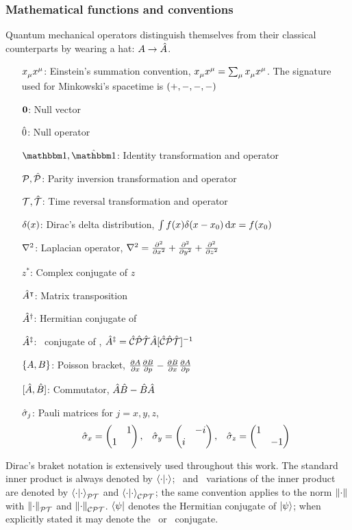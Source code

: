\subsubsection{Mathematical functions and conventions}
Quantum mechanical operators distinguish themselves from their classical counterparts by wearing a hat: $A \to \hat{A}$.
\begin{enumerate}
    \item[$\tensor{x}{_\mu}\tensor{x}{^\mu}$:] Einstein's summation convention, $\tensor{x}{_\mu}\tensor{x}{^\mu} = \sum\nolimits_\mu \tensor{x}{_\mu}\tensor{x}{^\mu}$. The signature used for Minkowski's spacetime is $\pqty{+,-, -, -}$
    \item[$\vb{0}$:] Null vector
    \item[$\hat{0}$:] Null operator 
    \item[$\idM,\hidM$:] Identity transformation and operator
    \item[$\mathcal{P},\mathcal{\hat{P}}$:] Parity inversion transformation and operator  
    \item[$\mathcal{T},\mathcal{\hat{T}}$:] Time reversal transformation and operator
    \item[$\delta\pqty{x}$:] Dirac's delta distribution, $\int{f\pqty{x}\delta\pqty{x-x_0}\dd{x}} = f\pqty{x_0}$
    \item[$\laplacian$:] Laplacian operator, $\laplacian = \pdv[2]{x} + \pdv[2]{y} + \pdv[2]{z}$ 
    \item[$z^*$:] Complex conjugate of $z$
    \item[$\hat{A}^\intercal$:] Matrix transposition
    \item[$\hat{A}^\dag$:] Hermitian conjugate of \hA
    \item[$\hat{A}^\ddag$:] \CPT\ conjugate of \hA, $\hA^\ddag = \CPTtransform{\hA}$
    \item[$\acomm*{A}{B}\!$:] Poisson bracket, $\pdv{A}{x}\pdv{B}{p} - \pdv{B}{x}\pdv{A}{p}$
    \item[$\comm*{\hA}{\hB}\!$:] Commutator, $\hat{A}\hat{B} - \hat{B}\hat{A}$  
    \item[$\hat{\sigma}_j$:] Pauli matrices for $j=x,y,z$,
        \begin{equation*}
            \togglehat{\sigma}_x = \pmqty{\admat{1,1}}
            \mycomma \quad
            \togglehat{\sigma}_y = \pmqty{\admat{-i,i}}
            \mycomma \quad
            \togglehat{\sigma}_z = \pmqty{\dmat{1,-1}}
        \end{equation*} 
\end{enumerate}
Dirac's braket notation is extensively used throughout this work. The standard inner product is always denoted by $\bra{\cdot}\ket{\cdot}$; \PT\ and \CPT\ variations of the inner product are denoted by $\braket{\cdot}{\cdot}_{\mathcal{P}\mathcal{T}}$ and $\braket{\cdot}{\cdot}_{\mathcal{C}\mathcal{P}\mathcal{T}}$; the same convention applies to the norm $\norm{\cdot}$ with $\norm{\cdot}_{\mathcal{P}\mathcal{T}}$ and $\norm{\cdot}_{\mathcal{C}\mathcal{P}\mathcal{T}}$. $\bra{\psi}$ denotes the Hermitian conjugate of $\ket{\psi}$; when explicitly stated it may denote the \PT\ or \CPT\ conjugate.